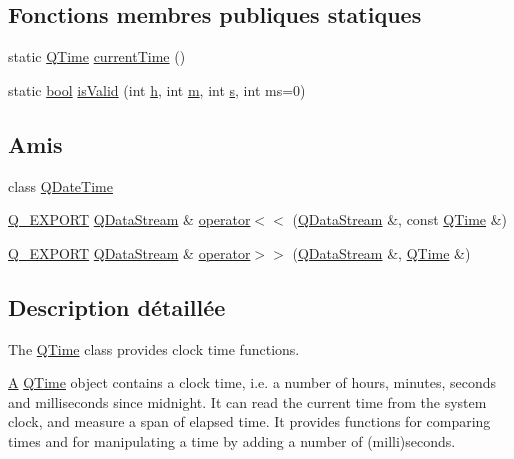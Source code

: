 \subsection*{Fonctions membres publiques statiques}
\begin{DoxyCompactItemize}
\item 
static \hyperlink{class_q_time}{Q\+Time} \hyperlink{class_q_time_a39b156ef7067e581f9fd70de6ef9ea4d}{current\+Time} ()
\item 
static \hyperlink{qglobal_8h_a1062901a7428fdd9c7f180f5e01ea056}{bool} \hyperlink{class_q_time_ac4290605812fb2c716e443bbe0409f60}{is\+Valid} (int \hyperlink{060__command__switch_8tcl_af96fd0966e32a310a0778d2e5c357700}{h}, int \hyperlink{060__command__switch_8tcl_a78d127e8bda64d4471ac811ad512fbd9}{m}, int \hyperlink{060__command__switch_8tcl_a011c73f2dbb87635a3b4206c72355f6e}{s}, int ms=0)
\end{DoxyCompactItemize}
\subsection*{Amis}
\begin{DoxyCompactItemize}
\item 
class \hyperlink{class_q_time_a9d2632bde958bcaf78a589a11578452e}{Q\+Date\+Time}
\item 
\hyperlink{qglobal_8h_a7323ea4c33b4021dee51e9b1f773538d}{Q\+\_\+\+E\+X\+P\+O\+R\+T} \hyperlink{class_q_data_stream}{Q\+Data\+Stream} \& \hyperlink{class_q_time_ac9b1103cf5f3deed4e057628fceca24d}{operator$<$$<$} (\hyperlink{class_q_data_stream}{Q\+Data\+Stream} \&, const \hyperlink{class_q_time}{Q\+Time} \&)
\item 
\hyperlink{qglobal_8h_a7323ea4c33b4021dee51e9b1f773538d}{Q\+\_\+\+E\+X\+P\+O\+R\+T} \hyperlink{class_q_data_stream}{Q\+Data\+Stream} \& \hyperlink{class_q_time_a6b14dcf689d047394691ac627c5d2074}{operator$>$$>$} (\hyperlink{class_q_data_stream}{Q\+Data\+Stream} \&, \hyperlink{class_q_time}{Q\+Time} \&)
\end{DoxyCompactItemize}


\subsection{Description détaillée}
The \hyperlink{class_q_time}{Q\+Time} class provides clock time functions. 

\hyperlink{class_a}{A} \hyperlink{class_q_time}{Q\+Time} object contains a clock time, i.\+e. a number of hours, minutes, seconds and milliseconds since midnight. It can read the current time from the system clock, and measure a span of elapsed time. It provides functions for comparing times and for manipulating a time by adding a number of (milli)seconds.

